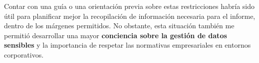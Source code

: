 Contar con una guía o una orientación previa sobre estas restricciones habría sido útil para planificar mejor la recopilación de información necesaria para el informe, dentro de los márgenes permitidos. No obstante, esta situación también me permitió desarrollar una mayor \textbf{conciencia sobre la gestión de datos sensibles} y la importancia de respetar las normativas empresariales en entornos corporativos.

